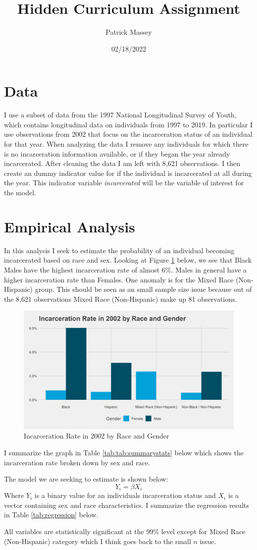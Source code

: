 \documentclass{article}
\author{Patrick Massey}
\title{Hidden Curriculum Assignment}
\date{02/18/2022}
\begin{document}
\maketitle

\section*{Data}
I use a subset of data from the 1997 National Longitudinal Survey of Youth, which contains longitudinal data on individuals from 1997 to 2019. In particular I use observations from 2002 that focus on the incarceration status of an individual for that year. When analyzing the data I remove any individuals for which there is no incarceration information available, or if they began the year already incarcerated. After cleaning the data I am left with 8,621 observations. I then create an dummy indicator value for if the individual is incarcerated at all during the year. This indicator variable \textit{incarcerated} will be the variable of interest for the model.
\newpage
\section*{Empirical Analysis} 
In this analysis I seek to estimate the probability of an individual becoming incarcerated based on race and sex. Looking at Figure \ref{fig:graph} below, we see that Black Males have the highest incarceration rate of almost 6\%. Males in general have a higher incarceration rate than Females. One anomaly is for the Mixed Race (Non-Hispanic) group. This should be seen as an small sample size issue because out of the 8,621 observations Mixed Race (Non-Hispanic) make up 81 observations.
\begin{figure}[H]
    \begin{center}
        \includegraphics[width=.85\textwidth]{incarceration_rate_by_racegender}
    \end{center}
    \caption{Incarceration Rate in 2002 by Race and Gender}
    \label{fig:graph}
\end{figure}
I summarize the graph in Table \ref{tab:tab:summarystats} below which shows the incarceration rate broken down by sex and race.

The model we are seeking to estimate is shown below:
\begin{equation*}
Y_i = \beta X_i 
\end{equation*}
\newpage
Where $Y_i$ is a binary value for an individuals incarceration status and $X_i$ is a vector containing sex and race characteristics. I summarize the regression results in Table \ref{tab:regression} below.



All variables are statistically significant at the 99\% level except for Mixed Race (Non-Hispanic) category which I think goes back to the small $n$ issue.
\end{document}
